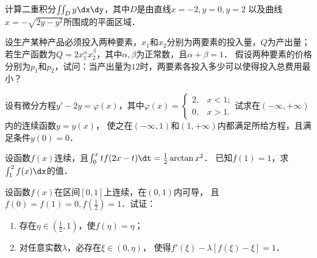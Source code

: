 \documentclass[plain,noanswer,medmath]{../../template/jnuexam}
\begin{document}

\begin{problem}
计算二重积分$\iint_D y\dx\dy$，其中$D$是由直线$x = - 2, y = 0, y = 2$
以及曲线$x = - \sqrt{2y - y^2}$所围成的平面区域．
\end{problem}



\begin{problem}
设生产某种产品必须投入两种要素，$x_1$和$x_2$分别为两要素的投入量，$Q$为产出量；
若生产函数为$Q = 2x_1^{\alpha}x_2^{\beta}$，其中$\alpha , \beta$为正常数，且$\alpha + \beta = 1$．
假设两种要素的价格分别为$p_1$和$p_2$，试问：当产出量为$12$时，两要素各投入多少可以使得投入总费用最小？
\end{problem}



\begin{problem}
设有微分方程$y' - 2y = \varphi(x)$，其中$\varphi (x) = \begin{cases}
  2, & x < 1; \\
  0, & x > 1.
\end{cases}$试求在$\left(-\infty , +\infty \right)$内的连续函数$y = y(x)$，
使之在$\left(-\infty ,1 \right)$和$\left(1, +\infty \right)$内都满足所给方程，且满足条件$y(0) = 0$．
\end{problem}



\begin{problem}
设函数$f(x)$连续，且$\int_0^x tf(2x - t)\dt = \frac{1}{2}\arctan x^2$．
已知$f(1) = 1$，求$\int_1^2 f(x)\dx$的值．
\end{problem}



\begin{problem}
设函数$f(x)$在区间$\left[0,1 \right]$上连续，在$\left(0,1 \right)$内可导，
且$f(0) = f(1) = 0, f\left(\frac{1}{2} \right) = 1$．试证：
\begin{enumerate}
\item 存在$\eta \in \left(\frac{1}{2},1 \right)$，使$f\left(\eta \right) = \eta$；
\item 对任意实数$\lambda$，必存在$\xi \in \left(0,\eta \right)$，
      使得$f'\left(\xi \right) - \lambda \left[f\left(\xi \right) - \xi \right] = 1$．
\end{enumerate}
\end{problem}


\end{document}
